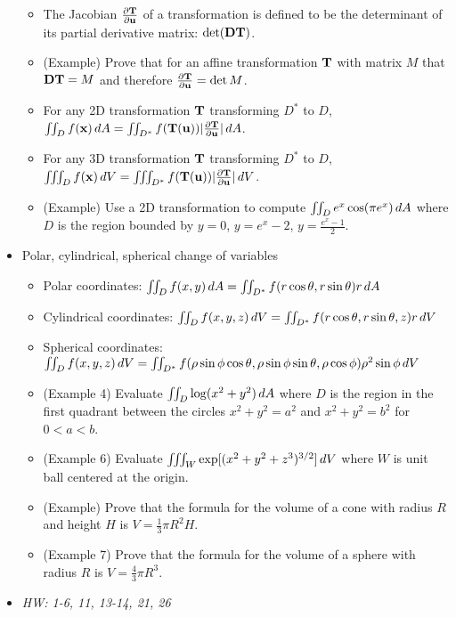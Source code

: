 \documentclass[11pt]{article}
\begin{document}
\begin{itemize}
\begin{itemize}
      \item The Jacobian \(\frac{\partial \mathbf{T}}{\partial \mathbf{u}}\) of a transformation
            is defined to be the determinant of its partial derivative matrix:
            \(\det(\mathbf{D}\mathbf{T})\).
      \item (Example) Prove that for an affine transformation \(\mathbf{T}\) with
            matrix \(M\) that \(\mathbf{D}\mathbf{T}=M\) and therefore
            \(\frac{\partial\mathbf{T}}{\partial\mathbf{u}}=\det M\).
      \item For any 2D transformation \(\mathbf{T}\)
            transforming \(D^*\) to \(D\),
            \(
              \iint_D f(\mathbf{x})\,d A
                =
              \iint_{D^*}f(\mathbf{T}(\mathbf{u}))|\frac{\partial\mathbf{T}}{\partial\mathbf{u}}|\,d A
            \).
      \item For any 3D transformation \(\mathbf{T}\)
            transforming \(D^*\) to \(D\),
            \(
              \iiint_D f(\mathbf{x})\,d V
                =
              \iiint_{D^*}f(\mathbf{T}(\mathbf{u}))|\frac{\partial\mathbf{T}}{\partial\mathbf{u}}|\,d V
            \).
      \item (Example) Use a 2D transformation to compute
            \(\iint_D e^x\cos(\pi e^x)\,d{A}\) where
            \(D\) is the region
            bounded by \(y=0\), \(y=e^x-2\), \(y=\frac{e^x-1}{2}\).
    \end{itemize}
  \item Polar, cylindrical, spherical change of variables
    \begin{itemize}
      \item Polar coordinates:
            \(
              \iint_D f(x,y)\,d A
                =
              \iint_{D^*}f(r\cos\theta,r\sin\theta)r\,d A
            \)
      \item Cylindrical coordinates:
            \(
              \iint_D f(x,y,z)\,d V
                =
              \iint_{D^*}f(r\cos\theta,r\sin\theta,z)r\,d V
            \)
      \item Spherical coordinates:
            \(
              \iint_D f(x,y,z)\,d V
                =
              \iint_{D^*} f(
                \rho\sin\phi\cos\theta,
                \rho\sin\phi\sin\theta,
                \rho\cos\phi
              )\rho^2\sin\phi\,d V
            \)
      \item (Example 4) Evaluate \(\iint_D\log(x^2+y^2)\,d A\) where \(D\)
            is the region in the first quadrant between the circles
            \(x^2+y^2=a^2\) and \(x^2+y^2=b^2\) for \(0<a<b\).
      \item (Example 6) Evaluate \(\iiint_W\exp[(x^2+y^2+z^3)^{3/2}]\,d V\)
            where \(W\) is unit ball centered at the origin.
      \item (Example) Prove that the formula for the volume of a cone with
            radius \(R\) and height \(H\) is \(V=\frac{1}{3}\pi R^2H\).
      \item (Example 7) Prove that the formula for the volume of a sphere with
            radius \(R\) is \(V=\frac{4}{3}\pi R^3\).
    \end{itemize}
  \item\textit{
    HW: 1-6, 11, 13-14, 21, 26
  }
\end{itemize}
\end{document}
